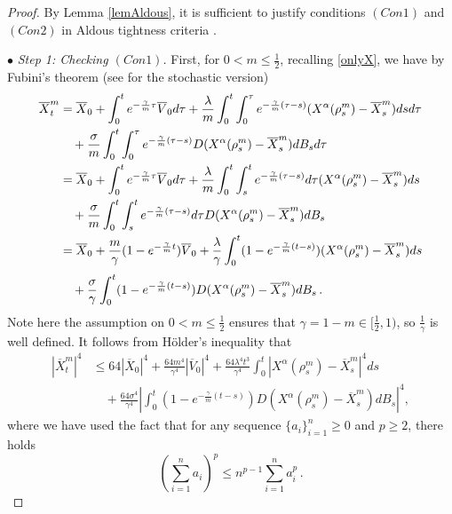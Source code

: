 \documentclass{ims9x6}
\newcommand{\nn}{\nonumber}
\newcommand{\OV}{\overline{V}}
\newcommand{\OX}{\overline{X}}
\begin{document}
\begin{proof}
	By Lemma \ref{lemAldous}, it is sufficient to justify conditions $(Con 1)$ and $(Con 2)$ in Aldous tightness criteria .
	
	$\bullet$ \textit{Step 1: Checking $(Con 1)$. }  
	First, for $0< m\leq \frac{1}{2}$, recalling \eqref{onlyX}, we have by Fubini's theorem (see \cite[Theorem 4.33]{da2014stochastic} for the stochastic version)
	\begin{align}\label{Fubini}
	\OX_t^m&=\OX_0+\int_0^t  e^{-\frac{\gamma}{m}\tau}\OV_0d\tau
	+\frac{\lambda}{m}\int_0^t\int_0^\tau e^{-\frac{\gamma}{m}(\tau-s)}(X^{\alpha}(\rho_s^m)-\OX_s^m)dsd\tau\notag\\
	& \quad +\frac{\sigma}{m}\int_0^t\int_0^\tau e^{-\frac{\gamma}{m}(\tau-s)}D(X^{\alpha}(\rho_s^m)-\OX_s^m)dB_s d\tau \notag\\
	&=\OX_0+\int_0^t  e^{-\frac{\gamma}{m}\tau}\OV_0d\tau
	+\frac{\lambda}{m}\int_0^t\int_s^t e^{-\frac{\gamma}{m}(\tau-s)}d\tau (X^{\alpha}(\rho_s^m)-\OX_s^m)ds\notag\\
	& \quad +\frac{\sigma}{m}\int_0^t\int_s^t e^{-\frac{\gamma}{m}(\tau-s)}d\tau D(X^{\alpha}(\rho_s^m)-\OX_s^m)dB_s \notag\\
	&=\OX_0+\frac{m}{\gamma}(1-e^{-\frac{\gamma}{m}t})\OV_0
	+\frac{\lambda}{\gamma}\int_0^t(1-e^{-\frac{\gamma}{m}(t-s)}) (X^{\alpha}(\rho_s^m)-\OX_s^m)ds\notag\\[-.2cm] 
	\\[-.25cm]\nn
	& \quad +\frac{\sigma}{\gamma}\int_0^t(1-e^{-\frac{\gamma}{m}(t-s)}) D(X^{\alpha}(\rho_s^m)-\OX_s^m)dB_s\,.
	\end{align}
	Note here the assumption on $0< m\leq \frac{1}{2}$ ensures that $\gamma=1-m\in[\frac{1}{2},1)$, so $\frac{1}{\gamma}$ is well defined.
	It follows from H\"{o}lder's inequality that
		\begin{align}\label{Xes}
		|\OX_t^m|^4&\leq 64|\OX_0|^4+\frac{64m^4}{\gamma^4}|\OV_0|^4+\frac{64\lambda^4t^3}{\gamma^4}\int_0^t|X^{\alpha}(\rho_s^m)-\OX_s^m|^4ds \nn \\
		&\quad+\frac{64\sigma^4}{\gamma^4}\left|\int_0^{t}(1-e^{-\frac{\gamma}{m}(t-s)}) D(X^{\alpha}(\rho_s^m)-\OX_s^m)dB_s\right|^4,
		\end{align}
	where we have used the fact that for any sequence $\{a_i\}_{i=1}^n\geq 0$ and $p\geq 2$, there holds
	\begin{equation*}
	\left(\sum_{i=1}^{n}a_i\right)^p\leq n^{p-1}\sum_{i=1}^{n}a_i^p\,.
	\end{equation*}

\end{proof}
\end{document}
